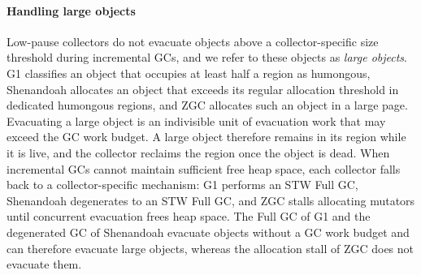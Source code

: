 \paragraph{\textbf{Handling large objects}}
Low-pause collectors do not evacuate objects above a collector-specific size threshold during incremental GCs, and we refer to these objects as \emph{large objects}.
G1 classifies an object that occupies at least half a region as humongous, Shenandoah allocates an object that exceeds its regular allocation threshold in dedicated humongous regions, and ZGC allocates such an object in a large page.
Evacuating a large object is an indivisible unit of evacuation work that may exceed the GC work budget.
A large object therefore remains in its region while it is live, and the collector reclaims the region once the object is dead.
When incremental GCs cannot maintain sufficient free heap space, each collector falls back to a collector-specific mechanism: G1 performs an STW Full GC, Shenandoah degenerates to an STW Full GC, and ZGC stalls allocating mutators until concurrent evacuation frees heap space.
The Full GC of G1 and the degenerated GC of Shenandoah evacuate objects without a GC work budget and can therefore evacuate large objects, whereas the allocation stall of ZGC does not evacuate them.
